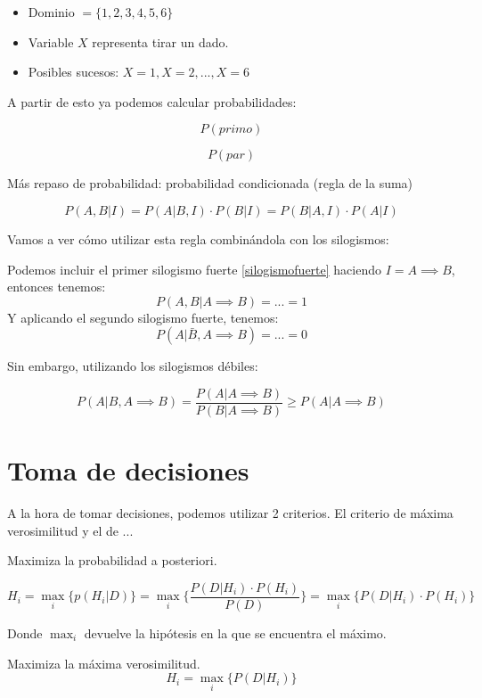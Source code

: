 \documentclass{apuntes}
\begin{document}
\begin{itemize}
	\item Dominio $= \{1,2,3,4,5,6\}$
	\item Variable $X$ representa tirar un dado.
	\item Posibles sucesos: $X=1,X=2,...,X=6$
\end{itemize}

A partir de esto ya podemos calcular probabilidades: 

$$P\left(primo\right)$$

$$P\left(par\right)$$



Más repaso de probabilidad: probabilidad condicionada (regla de la suma) 

\begin{defn}
\[P(A,B|I) = P(A|B,I) · P(B|I) = P(B|A,I) · P(A|I)\]
\end{defn}

Vamos a ver cómo utilizar esta regla combinándola con los silogismos:

Podemos incluir el primer silogismo fuerte \ref{silogismofuerte} haciendo $I= A\implies B$, entonces tenemos:
\[P(A,B|A\implies B) = ... = 1\]
Y aplicando el segundo silogismo fuerte, tenemos:
\[P(A|\bar{B}, A\implies B) = ... = 0\]

Sin embargo, utilizando los silogismos débiles:

\[ P(A|B,A\implies B) = \frac{P(A|A\implies B)}{P(B|A\implies B)} \geq P(A|A\implies B)\]


\section{Toma de decisiones}

A la hora de tomar decisiones, podemos utilizar 2 criterios. El criterio de máxima verosimilitud y el de ...


\begin{defn}
\label{CriterioMAP}
Maximiza la probabilidad a posteriori.

\[H_i = \max_i\{p(H_i | D)\} = \max_i \{\frac{P(D|H_i)·P(H_i)}{P(D)}\} = \max_i \{P(D|H_i)·P(H_i)\}\]

Donde $\max_i$ devuelve la hipótesis en la que se encuentra el máximo.
\end{defn}

\begin{defn}[Criterio MV]
\label{CriterioMV}
Maximiza la máxima verosimilitud.
\[
H_i = \max_i\{P(D|H_i)\}
\]

\end{defn}
\end{document}
